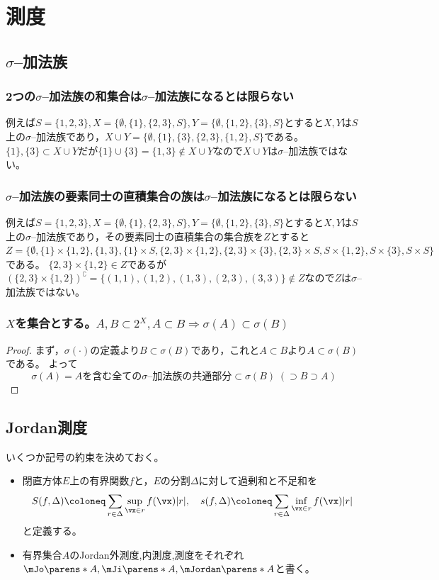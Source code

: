 \chapter{測度}
    \section{\texorpdfstring{$\sigma$}{σ}--加法族}
        \subsection{2つの\texorpdfstring{$\sigma$}{σ}--加法族の和集合は\texorpdfstring{$\sigma$}{σ}--加法族になるとは限らない}
            例えば$S=\{1,2,3\},X=\{\emptyset,\{1\},\{2,3\},S\},Y=\{\emptyset,\{1,2\},\{3\},S\}$とすると$X,Y$は$S$上の$\sigma$--加法族であり，$X\cup Y=\{\emptyset,\{1\},\{3\},\{2,3\},\{1,2\},S\}$である。$\{1\},\{3\}\subset X\cup Y$だが$\{1\}\cup\{3\} = \{1,3\} \notin X\cup Y$なので$X\cup Y$は$\sigma$--加法族ではない。
        \subsection{\texorpdfstring{$\sigma$}{σ}--加法族の要素同士の直積集合の族は\texorpdfstring{$\sigma$}{σ}--加法族になるとは限らない}
            例えば$S=\{1,2,3\},X=\{\emptyset,\{1\},\{2,3\},S\},Y=\{\emptyset,\{1,2\},\{3\},S\}$とすると$X,Y$は$S$上の$\sigma$--加法族であり，その要素同士の直積集合の集合族を$Z$とすると
            $Z=\{\emptyset,\{1\}\times\{1,2\},\{1,3\},\{1\}\times S,\{2,3\}\times\{1,2\},\{2,3\}\times\{3\},\{2,3\}\times S,S\times\{1,2\},S\times\{3\},S\times S\}$である。
            $\{2,3\}\times\{1,2\}\in Z$であるが$(\{2,3\}\times\{1,2\})^\complement = \{(1,1),(1,2),(1,3),(2,3),(3,3)\} \notin Z$なので$Z$は$\sigma$--加法族ではない。
        \subsection{\texorpdfstring{$X$}{X}を集合とする。\texorpdfstring{$A,B\subset 2^X,A\subset B\Rightarrow\sigma(A)\subset\sigma(B)$}{A,B⊂2\string^X, A⊂B ⇒ σ(A)⊂σ(B)}}
            \begin{proof}
                まず，$\sigma(\cdot)$の定義より$B\subset\sigma(B)$であり，これと$A\subset B$より$A\subset\sigma(B)$である。
                よって
                \[ \sigma(A) = A\text{を含む全ての}\sigma\text{--加法族の共通部分} \subset \sigma(B)\;(\supset B \supset A) \]
            \end{proof}
    \section{Jordan測度}
        いくつか記号の約束を決めておく。
        \begin{itemize}
            \item 閉直方体$E$上の有界関数$f$と，$E$の分割$\Delta$に対して過剰和と不足和を
            \[ S(f,\Delta) \coloneq \sum_{r\in\Delta} \sup_{\vx\in r}f(\vx)|r|,\quad s(f,\Delta) \coloneq \sum_{r\in\Delta} \inf_{\vx\in r}f(\vx)|r| \]
            と定義する。
            \item 有界集合$A$のJordan外測度,内測度,測度をそれぞれ$\mJo\parens*{A}, \mJi\parens*{A}, \mJordan\parens*{A}$と書く。
        \end{itemize}
